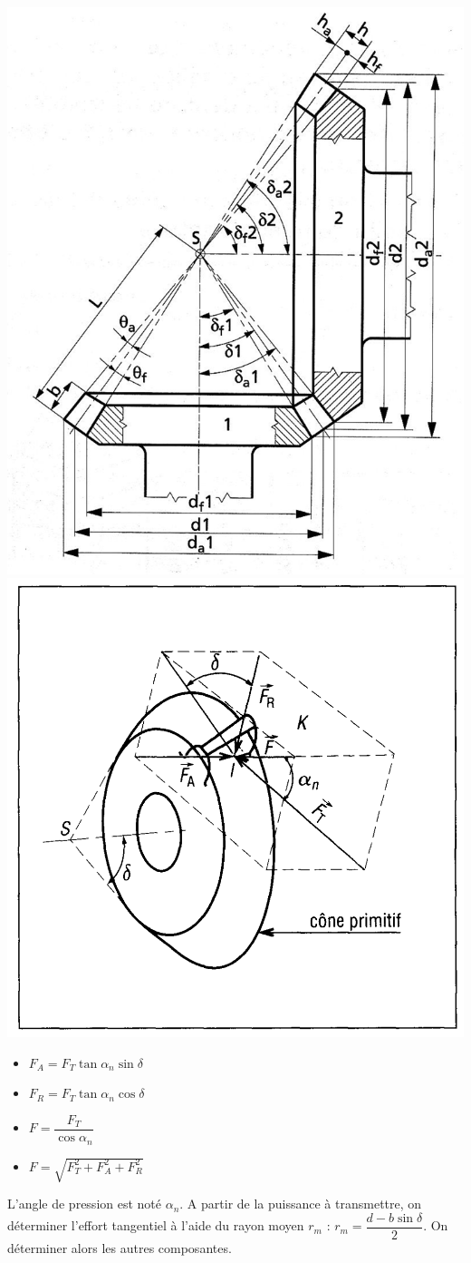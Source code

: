 \documentclass[11pt,oneside]{article}
\begin{document}
\begin{minipage}[c]{.5\linewidth}
\begin{center}
\includegraphics[width=.45\textwidth]{png/fig_72}
\includegraphics[width=.45\textwidth]{png/fig_73}
\end{center}
\end{minipage} \hfill
\begin{minipage}[c]{.45\linewidth}
\begin{itemize}
\item $F_A = F_T \tan \alpha_n \sin \delta$
\item $F_R = F_T \tan \alpha_n \cos \delta$
\item $F = \dfrac{F_T}{\cos \alpha_n}$
\item $F = \sqrt{F_T^2+F_A^2+F_R^2}$
\end{itemize}
L'angle de pression est noté $\alpha_n$. 
A partir de la puissance à transmettre, on déterminer l'effort tangentiel à l'aide du rayon moyen $r_m$ : $r_m = \dfrac{d-b\sin\delta}{2}$. On déterminer alors les autres composantes. 
\end{minipage}
\end{document}
